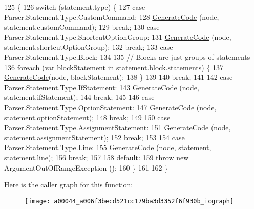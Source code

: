 \begin{DoxyCode}
125                                                                  \{
126             \textcolor{keywordflow}{switch} (statement.type) \{
127             \textcolor{keywordflow}{case} Parser.Statement.Type.CustomCommand:
128                 \hyperlink{a00044_a006f3becd521cc179ba3d3352f6f930b}{GenerateCode} (node, statement.customCommand);
129                 \textcolor{keywordflow}{break};
130             \textcolor{keywordflow}{case} Parser.Statement.Type.ShortcutOptionGroup:
131                 \hyperlink{a00044_a006f3becd521cc179ba3d3352f6f930b}{GenerateCode} (node, statement.shortcutOptionGroup);
132                 \textcolor{keywordflow}{break};
133             \textcolor{keywordflow}{case} Parser.Statement.Type.Block:
134 
135                 \textcolor{comment}{// Blocks are just groups of statements}
136                 \textcolor{keywordflow}{foreach} (var blockStatement \textcolor{keywordflow}{in} statement.block.statements) \{
137                     \hyperlink{a00044_a006f3becd521cc179ba3d3352f6f930b}{GenerateCode}(node, blockStatement);
138                 \}
139 
140                 \textcolor{keywordflow}{break};
141 
142             \textcolor{keywordflow}{case} Parser.Statement.Type.IfStatement:
143                 \hyperlink{a00044_a006f3becd521cc179ba3d3352f6f930b}{GenerateCode} (node, statement.ifStatement);
144                 \textcolor{keywordflow}{break};
145 
146             \textcolor{keywordflow}{case} Parser.Statement.Type.OptionStatement:
147                 \hyperlink{a00044_a006f3becd521cc179ba3d3352f6f930b}{GenerateCode} (node, statement.optionStatement);
148                 \textcolor{keywordflow}{break};
149 
150             \textcolor{keywordflow}{case} Parser.Statement.Type.AssignmentStatement:
151                 \hyperlink{a00044_a006f3becd521cc179ba3d3352f6f930b}{GenerateCode} (node, statement.assignmentStatement);
152                 \textcolor{keywordflow}{break};
153 
154             \textcolor{keywordflow}{case} Parser.Statement.Type.Line:
155                 \hyperlink{a00044_a006f3becd521cc179ba3d3352f6f930b}{GenerateCode} (node, statement, statement.line);
156                 \textcolor{keywordflow}{break};
157 
158             \textcolor{keywordflow}{default}:
159                 \textcolor{keywordflow}{throw} \textcolor{keyword}{new} ArgumentOutOfRangeException ();
160             \}
161 
162         \}
\end{DoxyCode}


Here is the caller graph for this function\-:
\nopagebreak
\begin{figure}[H]
\begin{center}
\leavevmode
\texttt{[image: a00044\_a006f3becd521cc179ba3d3352f6f930b\_icgraph]}
\end{center}
\end{figure}


